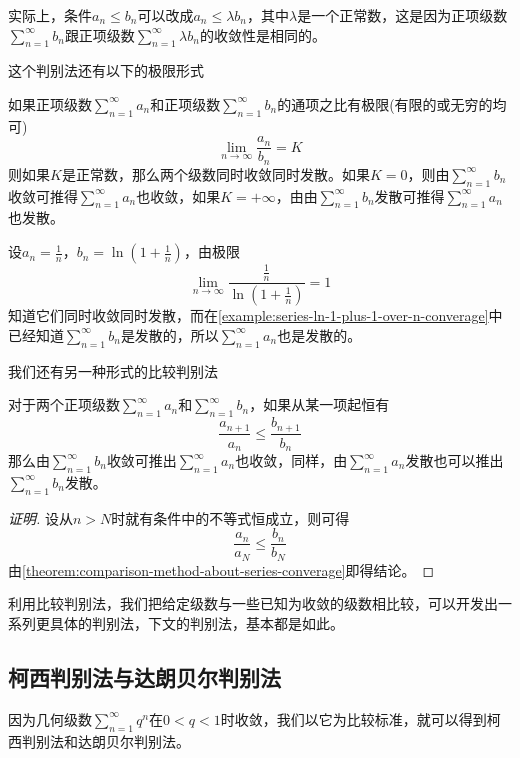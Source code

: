 实际上，条件$a_n \leqslant b_n$可以改成$a_n \leqslant \lambda b_n$，其中$\lambda$是一个正常数，这是因为正项级数$\sum_{n=1}^{\infty}b_n$跟正项级数$\sum_{n=1}^{\infty}\lambda b_n$的收敛性是相同的。

这个判别法还有以下的极限形式
\begin{theorem}
  如果正项级数$\sum_{n=1}^{\infty}a_n$和正项级数$\sum_{n=1}^{\infty}b_n$的通项之比有极限(有限的或无穷的均可)
  \[ \lim_{n \to \infty} \frac{a_n}{b_n} = K \]
  则如果$K$是正常数，那么两个级数同时收敛同时发散。如果$K=0$，则由$\sum_{n=1}^{\infty}b_n$收敛可推得$\sum_{n=1}^{\infty}a_n$也收敛，如果$K=+\infty$，由由$\sum_{n=1}^{\infty}b_n$发散可推得$\sum_{n=1}^{\infty}a_n$也发散。
\end{theorem}

\begin{example}
  设$a_n=\frac{1}{n}$，$b_n=\ln{\left( 1+\frac{1}{n} \right)}$，由极限
  \[ \lim_{n \to \infty} \frac{\frac{1}{n}}{\ln{\left( 1+\frac{1}{n} \right)}} =1 \]
  知道它们同时收敛同时发散，而在\autoref{example:series-ln-1-plus-1-over-n-converage}中已经知道$\sum_{n=1}^{\infty}b_n$是发散的，所以$\sum_{n=1}^{\infty}a_n$也是发散的。
\end{example}

我们还有另一种形式的比较判别法
\begin{theorem}
  对于两个正项级数$\sum_{n=1}^{\infty}a_n$和$\sum_{n=1}^{\infty}b_n$，如果从某一项起恒有
  \[ \frac{a_{n+1}}{a_n} \leqslant \frac{b_{n+1}}{b_n} \]
  那么由$\sum_{n=1}^{\infty}b_n$收敛可推出$\sum_{n=1}^{\infty}a_n$也收敛，同样，由$\sum_{n=1}^{\infty}a_n$发散也可以推出$\sum_{n=1}^{\infty}b_n$发散。
\end{theorem}

\begin{proof}[证明]
  设从$n>N$时就有条件中的不等式恒成立，则可得
  \[ \frac{a_n}{a_N} \leqslant \frac{b_n}{b_N} \]
  由\autoref{theorem:comparison-method-about-series-converage}即得结论。
\end{proof}

利用比较判别法，我们把给定级数与一些已知为收敛的级数相比较，可以开发出一系列更具体的判别法，下文的判别法，基本都是如此。

\subsection{柯西判别法与达朗贝尔判别法}
\label{sec:cauchy-dalembert-method-aboud-series-converage}

因为几何级数$\sum_{n=1}^{\infty}q^n$在$0<q<1$时收敛，我们以它为比较标准，就可以得到柯西判别法和达朗贝尔判别法。

